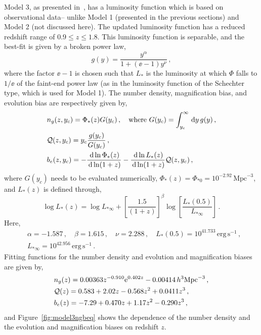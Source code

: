 Model 3, as presented in~\cite{Pozzetti:2016cch}, has a luminosity function which is based on observational data-- unlike Model 1 (presented in the previous sections) and Model 2 (not discussed here). The updated luminosity function has a reduced redshift range of $0.9 \leq z \leq 1.8$. This luminosity function is separable, and the best-fit is given by a broken power law, 
\begin{equation}
    g(y) = \frac{y^\alpha}{1 + (\ee - 1)y^\nu}\,,
\end{equation}
where the factor $\ee - 1$ is chosen such that $L_*$ is the luminosity at which $\Phi$ falls to $1/\ee$ of the faint-end power law (as in the luminosity function of the Schechter type, which is used for Model 1). The number density, magnification bias, and evolution bias are respectively given by, 
\begin{align}
    & n_g(z,y_c) = \Phi_*(z) G(y_c)\,,\quad \text{where } G(y_c) = \int_{y_c}^\infty \,\mathrm{d} y\, g(y) \, , \\
    &\mathcal{Q}(z,y_c) = y_c \frac{g(y_c)}{G(y_c)}\,,\\
    &b_e(z,y_c) = - \frac{\,\mathrm{d} \ln \Phi_*(z)}{\,\mathrm{d} \ln (1+z)} - \frac{\,\mathrm{d} \ln L_*(z)}{\,\mathrm{d} \ln (1+z)} \mathcal{Q}(z,y_c)\,,
\end{align}
where $G(y_c)$ needs to be evaluated numerically, $\Phi_*(z) = \Phi_{*0} = 10^{-2.92}\,\mathrm{Mpc}^{-3}$, and $L_*(z)$ is defined through, 
\begin{equation}
    \log L_*(z) = \log L_{*\infty} + \left[ \frac{1.5}{(1 + z)} \right]^\beta \log \left[ \frac{L_*(0.5)}{L_{*\infty}} \right]\,. 
\end{equation}
Here, 
\begin{align}
    &\alpha = -1.587\,,\quad \beta = 1.615\,,\quad \nu = 2.288\,,\quad L_*(0.5) = 10^{41.733}\,\mathrm{erg}\,\mathrm{s}^{-1}\,,\nonumber \\
    &L_{*\infty} = 10^{42.956}\,\mathrm{erg}\,\mathrm{s}^{-1}\,.
\end{align}
Fitting functions for the number density and evolution and magnification biases are given by, 
\begin{align}
    &n_g(z) = 0.00363 z^{-0.910} \mathrm{e}^{0.402 z} - 0.00414\,h^3 \mathrm{Mpc}^{-3}\,,\\
    & \mathcal{Q}(z) = 0.583 + 2.02 z - 0.568 z^2 + 0.0411 z^3\,,\\
    &b_e(z) = -7.29 + 0.470 z + 1.17 z^2 - 0.290 z^3\,,
\end{align}
and Figure~\ref{fig:model3ngbeq} shows the dependence of the number density and the evolution and magnification biases on redshift $z$.
